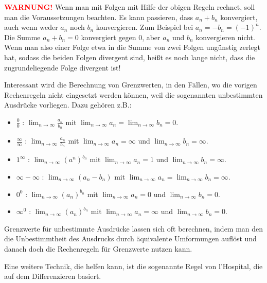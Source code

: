 \begin{bem}
	\textcolor{red}{\textbf{WARNUNG!}}
	Wenn man mit Folgen mit Hilfe der obigen Regeln rechnet, soll man die Voraussetzungen beachten. Es kann passieren, dass $a_n + b_n$ konvergiert, auch wenn weder $a_n$ noch $b_n$ konvergieren. Zum Beispiel bei $a_n = - b_n = (-1)^n$. Die Summe $a_n + b_n = 0$ konvergiert gegen $0$, aber $a_n$ und $b_n$ konvergieren nicht. Wenn man also einer Folge etwa in die Summe von zwei Folgen ungünstig zerlegt hat, sodass die beiden Folgen divergent sind, heißt es noch lange nicht, dass die zugrundeliegende Folge divergent ist!
\end{bem} 

\begin{bem} 
	Interessant wird die Berechnung von Grenzwerten, in den Fällen, wo die vorigen Rechenregeln nicht eingesetzt werden können, weil die sogenannten unbestimmten Ausdrücke vorliegen. Dazu gehören z.B.: 
	\begin{itemize} 
			\item[] {\color{red} \glqq $\frac{0}{0}$ \grqq:}  $\lim_{n \to \infty} \frac{a_n}{b_n}$ mit $\lim_{n \to \infty} a_n = \lim_{n \to \infty} b_n= 0$. 
			\item[] {\color{red} \glqq$\frac{\infty}{\infty}$ \grqq:}   $\lim_{n \to \infty} \frac{a_n}{b_n}$ mit $\lim_{n \to \infty} a_n  = \infty $ und $\lim_{n \to \infty} b_n  = \infty$. 
			\item[] {\color{red} \glqq$1^\infty$ \grqq: } $\lim_{n \to \infty} (a^n )^{b_n}$ mit $\lim_{n \to \infty} a _n = 1$ und $\lim_{n \to \infty} b_n = \infty$. 
			\item[]  {\color{red} \glqq $\infty - \infty$ \grqq: } $\lim_{n \to \infty} (a_n -b_n)$ mit $\lim_{n \to \infty} a_n = \lim_{n \to \infty} b_n = \infty$. 
			\item[] {\color{red} \glqq$0^0$ \grqq: } $\lim_{n \to \infty} (a_n )^{b_n}$ mit $\lim_{n \to \infty} a _n = 0$ und $\lim_{n \to \infty} b_n = 0$. 
			\item[] {\color{red} \glqq$\infty^0$ \grqq: } $\lim_{n \to \infty} (a_n )^{b_n}$ mit $\lim_{n \to \infty} a _n = \infty$ und $\lim_{n \to \infty} b_n = 0$. 
	\end{itemize} 
	Grenzwerte für unbestimmte Ausdrücke lassen sich oft berechnen, indem man den die Unbestimmtheit des Ausdrucks durch äquivalente Umformungen auflöst und danach doch die Rechenregeln für Grenzwerte nutzen kann. 
	
	Eine weitere Technik, die helfen kann, ist die sogenannte Regel von l'Hospital, die auf dem Differenzieren basiert. 
\end{bem} 

